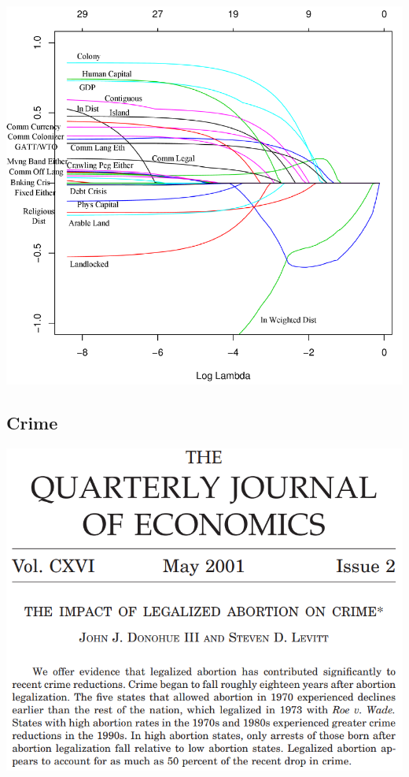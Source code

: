 \begin{frame}
    \vspace{-10pt}
    \begin{center}
    \includegraphics[height=0.85\textheight]{./resources/BaxterLassoPath}
    \end{center}
\end{frame}

\subsection{Crime}

\begin{frame}
    \vspace{-10pt}
    \begin{center}
    \includegraphics[height=0.85\textheight]{./resources/QJELevitt}
    \end{center}
\end{frame}

